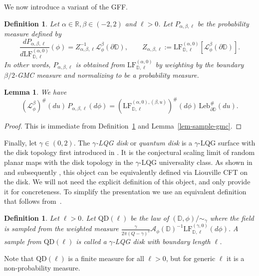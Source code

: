 \documentclass[a4paper]{article}
\numberwithin{equation}{section}
\newcommand{\D}{\mathbb{D}}
\newcommand{\R}{\mathbb{R}}
\newcommand{\cA}{\mathcal{A}}
\newcommand{\cL}{\mathcal{L}}
\newcommand{\QD}{\mathrm{QD}}
\newcommand{\LF}{\mathrm{LF}}
\newtheorem{lemma}[theorem]{Lemma}
\newtheorem{definition}[theorem]{Definition}
\theoremstyle{remark}
\numberwithin{equation}{section}
\begin{document}
We now introduce a variant of the GFF. 

\begin{definition}\label{def-P-weighted}
Let $\alpha \in \R, \beta \in (-2,2)$ and $\ell > 0$. 
    Let $P_{\alpha, \beta, \ell}$ be the probability measure defined by
    \[\frac{dP_{\alpha, \beta, \ell}}{d \LF^{(\alpha,0)}_{\D, \ell}} (\phi) = Z_{\alpha,\beta,\ell}^{-1} \cL^\beta_\phi(\partial \D), \qquad Z_{\alpha,\beta,\ell} := \LF^{(\alpha,0)}_{\D, \ell}[\cL^\beta_\phi(\partial \D)].\]
    In other words, $P_{\alpha, \beta, \ell}$ is obtained from $\LF^{(\alpha, 0)}_{\D, \ell}$ by weighting by the boundary $\beta/2$-GMC measure and    normalizing to be a probability measure. 
\end{definition}

\begin{lemma}\label{lem-sample-gmc-2}
    We have 
    \[(\cL^\beta_\phi)^\#(du) \,  P_{\alpha, \beta, \ell}(d\phi) = (\LF_{\D, \ell}^{(\alpha, 0), (\beta, u)})^\#(d\phi) \, \mathrm{Leb}_{\partial \D}^\#(du). \]
\end{lemma}
\begin{proof}
    This is immediate from Definition~\ref{def-P-weighted} and Lemma~\ref{lem-sample-gmc}. 
\end{proof}

Finally, let $\gamma \in (0,2)$. The \emph{$\gamma$-LQG disk} or  \emph{quantum disk} is a $\gamma$-LQG surface with the disk topology first introduced in \cite{DMS14}. It is the conjectural scaling limit of random planar maps with the disk topology in the $\gamma$-LQG universality class. As shown in \cite{cercle-disk} and subsequently \cite{ahs-integrability, ars-fzz}, this object can be equivalently defined via  Liouville CFT on the disk. We will not need the explicit definition of this object, and only provide it for concreteness. To simplify the presentation we use an equivalent definition that follows from~\cite[Theorem 3.4]{ars-fzz}. 

\begin{definition}\label{def-QD}
    Let $\ell > 0$. Let $\QD(\ell)$ be the law of $(\D, \phi)/{\sim_\gamma}$ where the field is sampled from the weighted measure $\frac{\gamma}{2\pi(Q-\gamma)^2}\cA_\phi(\D)^{-1}\LF_{\D, \ell}^{(\gamma, 0)}(d\phi)$. A sample from $\QD(\ell)$ is called a $\gamma$-LQG disk with boundary length $\ell$.
\end{definition}
Note that $\QD(\ell)$ is a finite measure for all $\ell> 0$, but for generic $\ell$ it is a non-probability measure.
\end{document}
